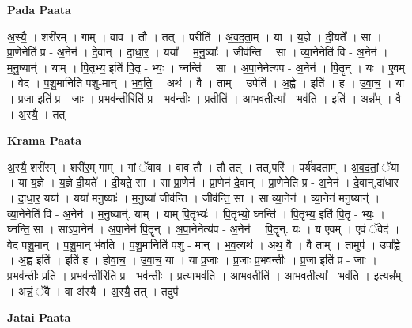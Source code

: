 \documentclass[17pt]{extarticle}
\begin{document}
\textbf{Pada Paata} \newline

अ॒स्यै॒ । शरी॑रम् । गाम् । वाव । तौ । तत् । परीति॑ । अ॒व॒द॒ता॒म् । या । य॒ज्ञे । दी॒यते᳚ । सा । प्रा॒णेनेति॑ प्र - अ॒नेन॑ । दे॒वान् । दा॒धा॒र॒ । यया᳚ । म॒नु॒ष्याः᳚ । जीव॑न्ति । सा । व्या॒नेनेति॑ वि - अ॒नेन॑ । म॒नु॒ष्यान्॑ । याम् । पि॒तृभ्य॒ इति॑ पि॒तृ - भ्यः॒ । घ्नन्ति॑ । सा । अ॒पा॒नेनेत्य॑प - अ॒नेन॑ । पि॒तॄन् । यः । ए॒वम् । वेद॑ । प॒शु॒मानिति॑ पशु-मान् । भ॒व॒ति॒ । अथ॑ । वै । ताम् । उपेति॑ । अ॒ह्वे॒ । इति॑ । ह॒ । उ॒वा॒च॒ । या । प्र॒जा इति॑ प्र - जाः । प्र॒भव॑न्ती॒रिति॑ प्र - भव॑न्तीः । प्रतीति॑ । आ॒भव॒तीत्या᳚ - भव॑ति । इति॑ । अन्न᳚म् । वै । अ॒स्यै॒ । तत् ।  \newline


\textbf{Krama Paata} \newline

अ॒स्यै॒ शरी॑रम् । शरी॑र॒म् गाम् । गां ॅवाव । वाव तौ । तौ तत् । तत्,परि॑ । पर्य॑वदताम् । अ॒व॒द॒तां॒ ॅया । या य॒ज्ञे । य॒ज्ञे दी॒यते᳚ । दी॒यते॒ सा । सा प्रा॒णेन॑ । प्रा॒णेन॑ दे॒वान् । प्रा॒णेनेति॑ प्र - अ॒नेन॑ । दे॒वान्,दा॑धार । दा॒धा॒र॒ यया᳚ । यया॑ मनु॒ष्याः᳚ । म॒नु॒ष्या॑ जीव॑न्ति । जीव॑न्ति॒ सा । सा व्या॒नेन॑ । व्या॒नेन॑ मनु॒ष्यान्॑ । व्या॒नेनेति॑ वि - अ॒नेन॑ । म॒नु॒ष्यान्॑. याम् । याम् पि॒तृभ्यः॑ । पि॒तृभ्यो॒ घ्नन्ति॑ । पि॒तृभ्य॒ इति॑ पि॒तृ - भ्यः॒ । घ्नन्ति॒ सा । साऽपा॒नेन॑ । अ॒पा॒नेन॑ पि॒तॄन् । अ॒पा॒नेनेत्य॑प - अ॒नेन॑ । पि॒तॄन्. यः । य ए॒वम् । ए॒वं ॅवेद॑ । वेद॑ पशु॒मान् । प॒शु॒मान् भ॑वति । प॒शु॒मानिति॑ पशु - मान् । भ॒व॒त्यथ॑ । अथ॒ वै । वै ताम् । तामुप॑ । उपा᳚ह्वे । अ॒ह्व॒ इति॑ । इति॑ ह । हो॒वा॒च॒ । उ॒वा॒च॒ या । या प्र॒जाः । प्र॒जाः प्र॒भव॑न्तीः । प्र॒जा इति॑ प्र - जाः । प्र॒भव॑न्तीः॒ प्रति॑ । प्र॒भव॑न्ती॒रिति॑ प्र - भव॑न्तीः । प्रत्या॒भव॑ति । आ॒भव॒तीति॑ । आ॒भव॒तीत्या᳚ - भव॑ति । इत्यन्न᳚म् । अन्नं॒ ॅवै । वा अ॑स्यै । अ॒स्यै॒ तत् । तदुप॑ \newline

\textbf{Jatai Paata} \newline
\end{document}
